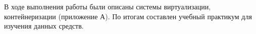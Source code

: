 
В ходе выполнения работы были описаны системы виртуализации, контейнеризации (приложение А). По итогам составлен учебный практикум для изучения данных средств.

\clearpage